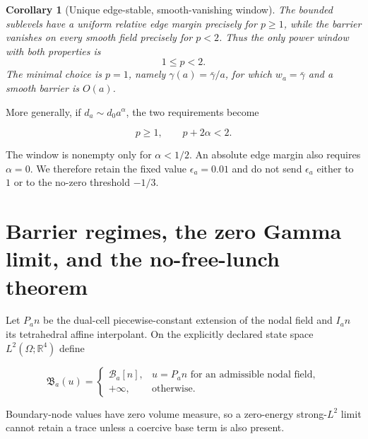 \documentclass[11pt]{article}
\numberwithin{equation}{section}
\newtheorem{corollary}[theorem]{Corollary}
\theoremstyle{definition}
\theoremstyle{remark}
\newcommand{\RR}{\mathbb R}
\newcommand{\cB}{\mathcal B}
\begin{document}
\begin{corollary}[Unique edge-stable, smooth-vanishing window]
The bounded sublevels have a uniform relative edge margin precisely for
$p\ge1$, while the barrier vanishes on every smooth field precisely for
$p<2$.  Thus the only power window with both properties is
\begin{equation}
 \boxed{1\le p<2.}
 \label{eq:window}
\end{equation}
The minimal choice is $p=1$, namely
$\gamma(a)=\bar\gamma/a$, for which $w_a=\bar\gamma$ and a smooth barrier
is $O(a)$.
\end{corollary}

More generally, if $d_a\sim d_0a^\alpha$, the two requirements become

\begin{equation}
 p\ge1,\qquad p+2\alpha<2.
 \label{eq:alpha-window}
\end{equation}

The window is nonempty only for $\alpha<1/2$.  An absolute edge margin also
requires $\alpha=0$.  We therefore retain the fixed value
$\epsilon_a=0.01$ and do not send $\epsilon_a$ either to $1$ or to the
no-zero threshold $-1/3$.

\section{Barrier regimes, the zero Gamma limit, and the no-free-lunch theorem}

Let $P_an$ be the dual-cell piecewise-constant extension of the nodal field
and $I_an$ its tetrahedral affine interpolant.  On the explicitly declared
state space $L^2(\Omega;\RR^4)$ define

\begin{equation}
 \mathfrak B_a(u)=
 \begin{cases}
 \cB_a[n],&u=P_an\text{ for an admissible nodal field},\\
 +\infty,&\text{otherwise}.
 \end{cases}
 \label{eq:embedded-barrier}
\end{equation}

Boundary-node values have zero volume measure, so a zero-energy strong-$L^2$
limit cannot retain a trace unless a coercive base term is also present.
\end{document}
